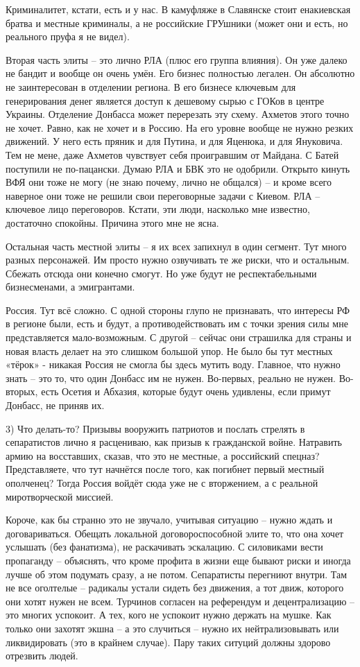 Криминалитет, кстати, есть и у нас. В камуфляже в Славянске стоит енакиевская
братва и местные криминалы, а не российские ГРУшники (может они и есть, но
реального пруфа я не видел). 

Вторая часть элиты – это лично РЛА (плюс его группа влияния). Он уже далеко не
бандит и вообще он очень умён. Его бизнес полностью легален. Он абсолютно не
заинтересован в отделении региона. В его бизнесе ключевым для генерирования
денег является доступ к дешевому сырью с ГОКов в центре Украины. Отделение
Донбасса может перерезать эту схему. Ахметов этого точно не хочет. Равно, как
не хочет и в Россию. На его уровне вообще не нужно резких движений. У него есть
пряник и для Путина, и для Яценюка, и для Януковича. Тем не мене, даже Ахметов
чувствует себя проигравшим от Майдана. С Батей поступили не по-пацански. Думаю
РЛА и БВК это не одобрили. Открыто кинуть ВФЯ они тоже не могу (не знаю почему,
лично не общался) – и кроме всего наверное они тоже не решили свои переговорные
задачи с Киевом. РЛА – ключевое лицо переговоров. Кстати, эти люди, насколько
мне известно, достаточно спокойны. Причина этого мне не ясна.

Остальная часть местной элиты – я их всех запихнул в один сегмент. Тут много
разных персонажей. Им просто нужно озвучивать те же риски, что и остальным.
Сбежать отсюда они конечно смогут. Но уже будут не респектабельными
бизнесменами, а эмигрантами.

Россия. Тут всё сложно. С одной стороны глупо не признавать, что интересы РФ в
регионе были, есть и будут, а противодействовать им с точки зрения силы мне
представляется мало-возможным. С другой – сейчас они страшилка для страны и
новая власть делает на это слишком большой упор. Не было бы тут местных «тёрок»
- никакая Россия не смогла бы здесь мутить воду. Главное, что нужно знать – это
то, что один Донбасс им не нужен. Во-первых, реально не нужен. Во-вторых, есть
Осетия и Абхазия, которые будут очень удивлены, если примут Донбасс, не приняв
их.

3) Что делать-то? Призывы вооружить патриотов и послать стрелять в сепаратистов
лично я расцениваю, как призыв к гражданской войне. Натравить армию на
восставших, сказав, что это не местные, а российский спецназ? Представляете,
что тут начнётся после того, как погибнет первый местный ополченец? Тогда
Россия войдёт сюда уже не с вторжением, а с реальной миротворческой миссией.

Короче, как бы странно это не звучало, учитывая ситуацию – нужно ждать и
договариваться. Обещать локальной договороспособной элите то, что она хочет
услышать (без фанатизма), не раскачивать эскалацию. С силовиками вести
пропаганду – объяснять, что кроме профита в жизни еще бывают риски и иногда
лучше об этом подумать сразу, а не потом. Сепаратисты перегниют внутри. Там не
все оголтелые – радикалы устали сидеть без движения, а тот движ, которого они
хотят нужен не всем. Турчинов согласен на референдум и децентрализацию – это
многих успокоит. А тех, кого не успокоит нужно держать на мушке. Как только они
захотят экшна – а это случиться – нужно их нейтрализовывать или ликвидировать
(это в крайнем случае). Пару таких ситуций должны здорово отрезвить людей.

